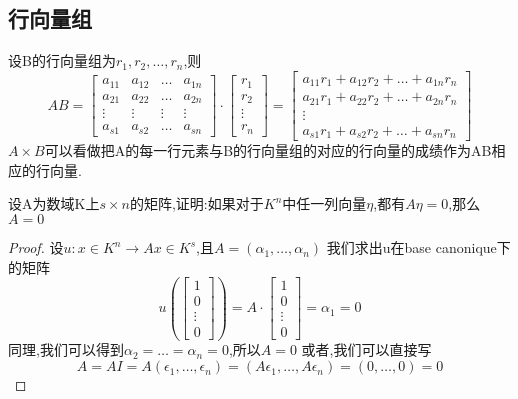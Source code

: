 \documentclass{book}
\begin{document}
\subsection{行向量组}
设B的行向量组为$r_1,r_2,\ldots,r_n$,则
$$
AB=
\begin{bmatrix}
  a_{11} & a_{12} & \dots & a_{1n}  \\
  a_{21} & a_{22} & \dots & a_{2n}  \\
  \vdots & \vdots & \vdots &\vdots \\
  a_{s1} & a_{s2} & \dots & a_{sn}
\end{bmatrix}
\cdot
\begin{bmatrix}
  r_1 \\
  r_2 \\
  \vdots \\
  r_n
\end{bmatrix}
=
\begin{bmatrix}
  a_{11}r_1 + a_{12}r_2 + \dots + a_{1n}r_n  \\
  a_{21}r_1 + a_{22}r_2 + \dots + a_{2n}r_n   \\
  \vdots \\
  a_{s1}r_1 + a_{s2}r_2 + \dots + a_{sn}r_n
\end{bmatrix}
$$
$A\times B$可以看做把A的每一行元素与B的行向量组的对应的行向量的成绩作为AB相应的行向量.

\begin{question}
  设A为数域K上$s \times n$的矩阵,证明:如果对于$K^n$中任一列向量$\eta$,都有$A\eta=0$,那么$A=0$
\end{question}
\begin{proof}
  设$u:x \in K^n \rightarrow Ax \in K^s$,且$A=(\alpha_1,\ldots,\alpha_n)$ \newline
  我们求出u在base canonique下的矩阵 \newline
  $$
  u(\begin{bmatrix}
    1 \\
    0\\
    \vdots \\
    0
  \end{bmatrix})
  =A \cdot
  \begin{bmatrix}
    1 \\
    0\\
    \vdots \\
    0
  \end{bmatrix}
  =\alpha_1=0
  $$
  同理,我们可以得到$\alpha_2=\dots=\alpha_n=0$,所以$A=0$ \newline
  或者,我们可以直接写
  $$
  A=AI=A(\epsilon_1,\ldots,\epsilon_n)=(A\epsilon_1,\dots,A\epsilon_n)=(0,\ldots,0)=0
  $$
\end{proof}
\end{document}
